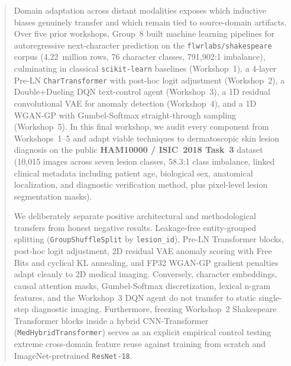 \begin{abstract}
Domain adaptation across distant modalities exposes which inductive biases genuinely transfer and which remain tied to source-domain artifacts. Over five prior workshops, Group~8 built machine learning pipelines for autoregressive next-character prediction on the \texttt{flwrlabs/shakespeare} corpus (4.22~million rows, 76 character classes, 791,902:1 imbalance), culminating in classical \texttt{scikit-learn} baselines (Workshop~1), a 4-layer Pre-LN \texttt{CharTransformer} with post-hoc logit adjustment (Workshop~2), a Double+Dueling DQN text-control agent (Workshop~3), a 1D residual convolutional VAE for anomaly detection (Workshop~4), and a 1D WGAN-GP with Gumbel-Softmax straight-through sampling (Workshop~5). In this final workshop, we audit every component from Workshops~1--5 and adapt viable techniques to dermatoscopic skin lesion diagnosis on the public \textbf{HAM10000 / ISIC~2018 Task~3} dataset (10,015 images across seven lesion classes, 58.3:1 class imbalance, linked clinical metadata including patient age, biological sex, anatomical localization, and diagnostic verification method, plus pixel-level lesion segmentation masks).

We deliberately separate positive architectural and methodological transfers from honest negative results. Leakage-free entity-grouped splitting (\texttt{GroupShuffleSplit} by \texttt{lesion\_id}), Pre-LN Transformer blocks, post-hoc logit adjustment, 2D residual VAE anomaly scoring with Free Bits and cyclical KL annealing, and FP32 WGAN-GP gradient penalties adapt cleanly to 2D medical imaging. Conversely, character embeddings, causal attention masks, Gumbel-Softmax discretization, lexical n-gram features, and the Workshop~3 DQN agent do not transfer to static single-step diagnostic imaging. Furthermore, freezing Workshop~2 Shakespeare Transformer blocks inside a hybrid CNN-Transformer (\texttt{MedHybridTransformer}) serves as an explicit empirical control testing extreme cross-domain feature reuse against training from scratch and ImageNet-pretrained \texttt{ResNet-18}.


\end{abstract}
